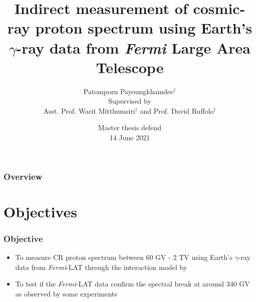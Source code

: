 \documentclass{beamer}
\title[CR proton from $\gamma$-ray Earth's Limb]{Indirect measurement of cosmic-ray proton spectrum using Earth's $\gamma$-ray data from {\it Fermi} Large Area Telescope }
\author[P. Payoungkhamdee]{
  Patomporn Payoungkhamdee$^{\dagger}$ \\
  {
    \small Supervised by \\
    Asst. Prof. Warit Mitthumsiri$^{\dagger}$ and Prof. David Ruffolo$^{\dagger}$
  }
} %
\institute[MU] %
{
  $^{\dagger}$Department of Physics, Faculty of Science, Mahidol University \\ %
\medskip
\textit{patomporn.pay@gmail.com} %

}
\date[14 June 2021]{Master thesis defend \\ 14 June 2021} %
\newcommand{\nologo}{\setbeamertemplate{logo}{}}
\begin{document}
{\nologo
\begin{frame}
\titlepage %
\end{frame}
}

\begin{frame}
\frametitle{Overview} %
\tableofcontents %
\end{frame}



\section{Objectives}

\begin{frame}
\frametitle{Objective}
\begin{itemize}
  \item To measure CR proton spectrum between 60 GV - 2 TV using
  Earth's $\gamma$-ray data from \textit{Fermi}-LAT
  through the interaction model by \cite{K&Omodel}
  \item To test if the \textit{Fermi}-LAT data confirm the
  spectral break at around 340 GV as observed by some experiments
\end{itemize}
\end{frame}


\end{document}
